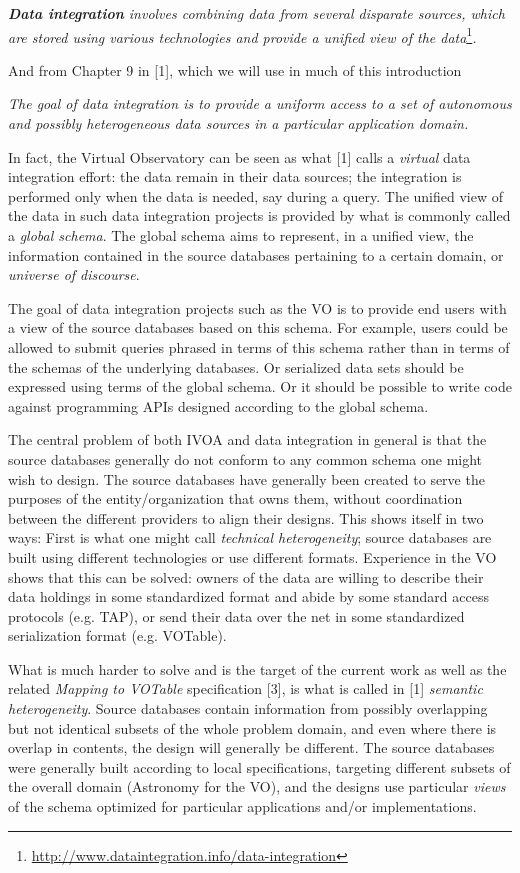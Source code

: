 \documentclass[10pt,a4paper]{ivoa}
\begin{document}
\emph{\textbf{Data integration} involves combining data from several
disparate sources, which are stored using various technologies and
provide a unified view of the data}\footnote{\url{http://www.dataintegration.info/data-integration}}\emph{.}

And from Chapter 9 in {[}1{]}, which we will use in much of this
introduction

\emph{The goal of data integration is to provide a uniform access to a
set of autonomous and possibly heterogeneous data sources in a
particular application domain.}

In fact, the Virtual Observatory can be seen as what {[}1{]} calls a
\emph{virtual} data integration effort: the data remain in their data
sources; the integration is performed only when the data is needed, say
during a query. The unified view of the data in such data integration
projects is provided by what is commonly called a \emph{global schema}.
The global schema aims to represent, in a unified view, the information
contained in the source databases pertaining to a certain domain, or
\emph{universe of discourse}.

The goal of data integration projects such as the VO is to provide end
users with a view of the source databases based on this schema. For
example, users could be allowed to submit queries phrased in terms of
this schema rather than in terms of the schemas of the underlying
databases. Or serialized data sets should be expressed using terms of
the global schema. Or it should be possible to write code against
programming APIs designed according to the global schema.

The central problem of both IVOA and data integration in general is that
the source databases generally do not conform to any common schema one
might wish to design. The source databases have generally been created
to serve the purposes of the entity/organization that owns them, without
coordination between the different providers to align their designs.
This shows itself in two ways: First is what one might call
\emph{technical heterogeneity}; source databases are built using
different technologies or use different formats. Experience in the VO
shows that this can be solved: owners of the data are willing to
describe their data holdings in some standardized format and abide by
some standard access protocols (e.g. TAP), or send their data over the
net in some standardized serialization format (e.g. VOTable).

What is much harder to solve and is the target of the current work as
well as the related \emph{Mapping to VOTable} specification {[}3{]}, is
what is called in {[}1{]} \emph{semantic heterogeneity}. Source
databases contain information from possibly overlapping but not
identical subsets of the whole problem domain, and even where there is
overlap in contents, the design will generally be different. The source
databases were generally built according to local specifications,
targeting different subsets of the overall domain (Astronomy for the
VO), and the designs use particular \emph{views} of the schema optimized
for particular applications and/or implementations.
\end{document}
